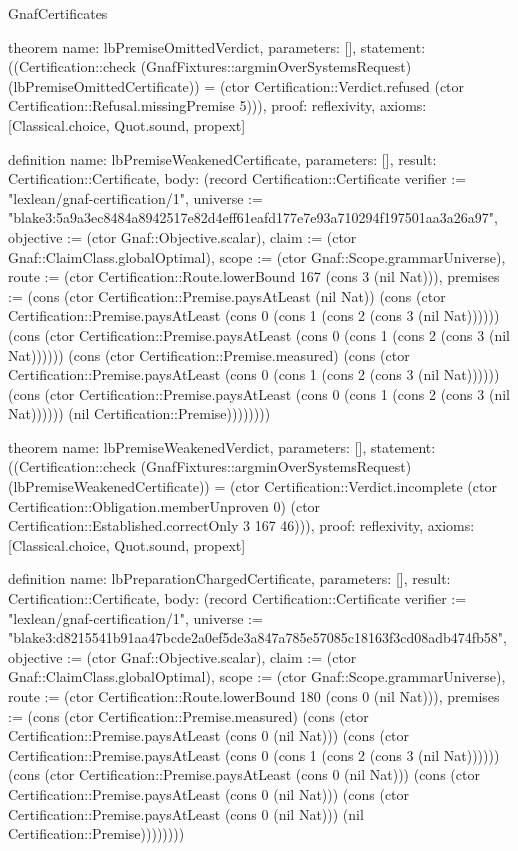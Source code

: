 \begin{lexlean}{GnafCertificates}
\begin{semanticmodule}
theorem{
  name: lbPremiseOmittedVerdict,
  parameters: [],
  statement: ((Certification::check (GnafFixtures::argminOverSystemsRequest) (lbPremiseOmittedCertificate)) = (ctor Certification::Verdict.refused (ctor Certification::Refusal.missingPremise 5))),
  proof: reflexivity{},
  axioms: [Classical.choice, Quot.sound, propext]
}

definition{
  name: lbPremiseWeakenedCertificate,
  parameters: [],
  result: Certification::Certificate,
  body: (record Certification::Certificate {verifier := "lexlean/gnaf-certification/1", universe := "blake3:5a9a3ec8484a8942517e82d4eff61eafd177e7e93a710294f197501aa3a26a97", objective := (ctor Gnaf::Objective.scalar), claim := (ctor Gnaf::ClaimClass.globalOptimal), scope := (ctor Gnaf::Scope.grammarUniverse), route := (ctor Certification::Route.lowerBound 167 (cons 3 (nil Nat))), premises := (cons (ctor Certification::Premise.paysAtLeast (nil Nat)) (cons (ctor Certification::Premise.paysAtLeast (cons 0 (cons 1 (cons 2 (cons 3 (nil Nat)))))) (cons (ctor Certification::Premise.paysAtLeast (cons 0 (cons 1 (cons 2 (cons 3 (nil Nat)))))) (cons (ctor Certification::Premise.measured) (cons (ctor Certification::Premise.paysAtLeast (cons 0 (cons 1 (cons 2 (cons 3 (nil Nat)))))) (cons (ctor Certification::Premise.paysAtLeast (cons 0 (cons 1 (cons 2 (cons 3 (nil Nat)))))) (nil Certification::Premise)))))))})
}

theorem{
  name: lbPremiseWeakenedVerdict,
  parameters: [],
  statement: ((Certification::check (GnafFixtures::argminOverSystemsRequest) (lbPremiseWeakenedCertificate)) = (ctor Certification::Verdict.incomplete (ctor Certification::Obligation.memberUnproven 0) (ctor Certification::Established.correctOnly 3 167 46))),
  proof: reflexivity{},
  axioms: [Classical.choice, Quot.sound, propext]
}

definition{
  name: lbPreparationChargedCertificate,
  parameters: [],
  result: Certification::Certificate,
  body: (record Certification::Certificate {verifier := "lexlean/gnaf-certification/1", universe := "blake3:d8215541b91aa47bcde2a0ef5de3a847a785e57085c18163f3cd08adb474fb58", objective := (ctor Gnaf::Objective.scalar), claim := (ctor Gnaf::ClaimClass.globalOptimal), scope := (ctor Gnaf::Scope.grammarUniverse), route := (ctor Certification::Route.lowerBound 180 (cons 0 (nil Nat))), premises := (cons (ctor Certification::Premise.measured) (cons (ctor Certification::Premise.paysAtLeast (cons 0 (nil Nat))) (cons (ctor Certification::Premise.paysAtLeast (cons 0 (cons 1 (cons 2 (cons 3 (nil Nat)))))) (cons (ctor Certification::Premise.paysAtLeast (cons 0 (nil Nat))) (cons (ctor Certification::Premise.paysAtLeast (cons 0 (nil Nat))) (cons (ctor Certification::Premise.paysAtLeast (cons 0 (nil Nat))) (nil Certification::Premise)))))))})
}


\end{semanticmodule}
\end{lexlean}

